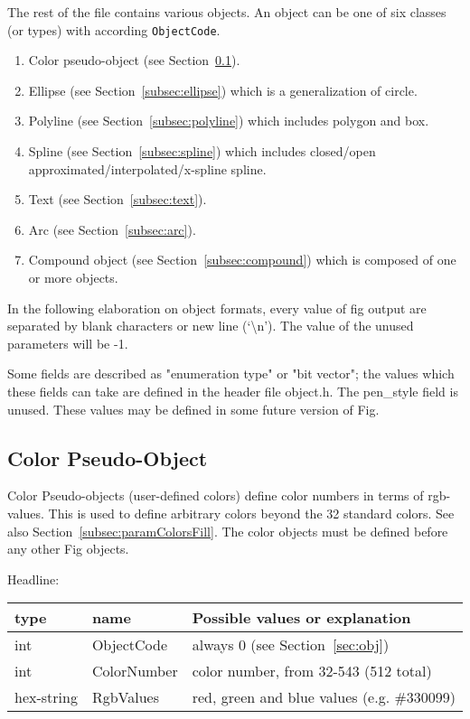 \documentclass[10pt, a4paper]{article}
\begin{document}
The rest of the file contains various objects.  
An object can be one of six classes (or types) with according {\tt ObjectCode}.
%
\begin{enumerate}
\item[0]
Color pseudo-object (see Section~\ref{subsec:colorPseudoObj}). 
\item
Ellipse (see Section~\ref{subsec:ellipse}) which is a generalization of circle.
\item
Polyline (see Section~\ref{subsec:polyline}) which includes polygon and box.
\item
Spline (see Section~\ref{subsec:spline}) 
which includes closed/open approximated/interpolated/x-spline spline.
\item
Text (see Section~\ref{subsec:text}).
\item
Arc (see Section~\ref{subsec:arc}).
\item
Compound object (see Section~\ref{subsec:compound}) 
which is composed of one or more objects. 
\end{enumerate}

In the following elaboration on object formats, 
every value of fig output are separated by blank characters 
or new line (`\textbackslash n').  
The value of the unused parameters will be -1.

 Some fields are described as "enumeration type" or "bit vector"; the
 values which these fields can take are defined in the header file object.h.
 The pen\_style field is unused.
 These values may be defined in some future version of Fig.


\setcounter{subsection}{-1}
\subsection{Color Pseudo-Object}\label{subsec:colorPseudoObj}

Color Pseudo-objects (user-defined colors) 
define color numbers in terms of rgb-values. 
This is used to define arbitrary colors beyond the 32 standard colors. 
See also Section~\ref{subsec:paramColorsFill}. 
The color objects must be defined before any other Fig objects.

\noindent
Headline: \\
%
\begin{tabular}{|lll|}
\hline
type & name & Possible values or explanation \\
\hline
\hline
int        & ObjectCode  & always 0 (see Section~\ref{sec:obj}) \\
int        & ColorNumber & color number, from 32-543 (512 total)\\
hex-string & RgbValues   & red, green and blue values (e.g. \#330099) \\
\hline
\end{tabular}
\end{document}
